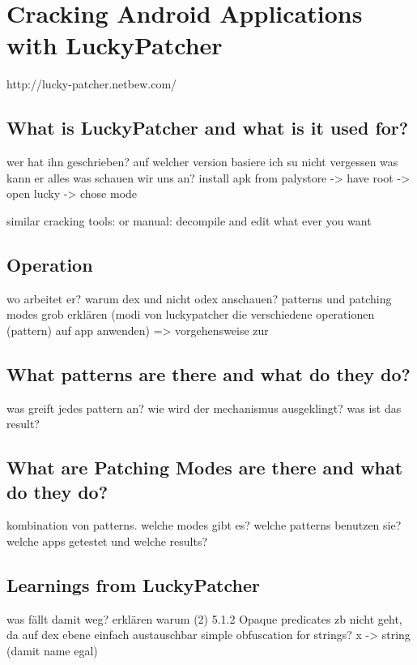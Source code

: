 \chapter{Cracking Android Applications with LuckyPatcher}\label{chapter:luckypatcher}
http://lucky-patcher.netbew.com/

\section{What is LuckyPatcher and what is it used for?}\label{section:luckypatcher-explain}
wer hat ihn geschrieben?\newline
auf welcher version basiere ich\newline
su nicht vergessen\newline
was kann er alles\newline
was schauen wir uns an?\newline
install apk from palystore -> have root -> open lucky -> chose mode

similar cracking tools:\newline
or manual: decompile and edit what ever you want \newline

\section{Operation}\label{section:luckypatcher-operation}
wo arbeitet er?\newline
warum dex und nicht odex anschauen?\newline
patterns und patching modes grob erklären (modi von luckypatcher die verschiedene operationen (pattern) auf app anwenden) => vorgehensweise zur

\section{What patterns are there and what do they do?}\label{section:luckypatcher-patterns}
was greift jedes pattern an? wie wird der mechanismus ausgeklingt? was ist das result?

\section{What are Patching Modes are there and what do they do?}\label{section:luckypatcher-modes}
kombination von patterns.\newline
welche modes gibt es? welche patterns benutzen sie?\newline
welche apps getestet und welche results?

\section{Learnings from LuckyPatcher}\label{section:luckypatcher-learnings}
was fällt damit weg?\newline
erklären warum 	(2) 5.1.2 Opaque predicates zb nicht geht, da auf dex ebene einfach austauschbar\newline
simple obfuscation for strings? x -> string (damit name egal)
